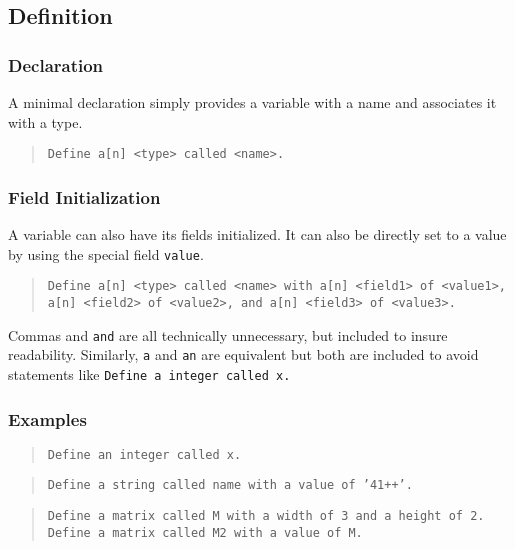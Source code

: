 \documentclass{article}
\newcommand{\code}[1]{\texttt{#1}}
\newcommand{\codeblock}[1]{\begin{quote}\code{#1}\end{quote}}
\begin{document}
\subsection{Definition}
\subsubsection{Declaration}
A minimal declaration simply provides a variable with a name and associates it with a type.

\codeblock{Define a[n] <type> called <name>.}

\subsubsection{Field Initialization}
A variable can also have its fields initialized. It can also be directly set to a value by using the special field \code{value}.

\codeblock{Define a[n] <type> called <name> with a[n] <field1> of <value1>, a[n] <field2> of <value2>, and a[n] <field3> of <value3>.}

\noindent Commas and \code{and} are all technically unnecessary, but included to insure readability. Similarly, \code{a} and \code{an} are equivalent but both are included to avoid statements like \code{Define a integer called x.}
\subsubsection{Examples}

\codeblock{Define an integer called x.}

\codeblock{Define a string called name with a value of '41++'.}

\codeblock{Define a matrix called M with a width of 3 and a height of 2. Define a matrix called M2 with a value of M.}
\end{document}
